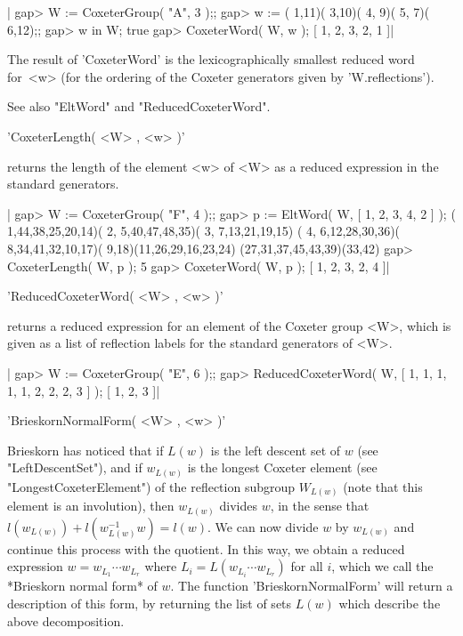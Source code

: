|    gap> W := CoxeterGroup( "A", 3 );;
    gap> w := ( 1,11)( 3,10)( 4, 9)( 5, 7)( 6,12);;
    gap> w in W;
    true
    gap> CoxeterWord( W, w );
    [ 1, 2, 3, 2, 1 ]|

The result  of 'CoxeterWord'  is the lexicographically  smallest reduced
word  for~<w> (for  the  ordering  of the  Coxeter  generators given  by
'W.reflections').

See also "EltWord" and "ReducedCoxeterWord".


'CoxeterLength( <W> , <w> )'

returns the length of the element <w>  of <W> as a reduced expression in
the standard generators.

|    gap> W := CoxeterGroup( "F", 4 );;
    gap> p := EltWord( W, [ 1, 2, 3, 4, 2 ] );
    ( 1,44,38,25,20,14)( 2, 5,40,47,48,35)( 3, 7,13,21,19,15)
    ( 4, 6,12,28,30,36)( 8,34,41,32,10,17)( 9,18)(11,26,29,16,23,24)
    (27,31,37,45,43,39)(33,42)
    gap> CoxeterLength( W, p );
    5
    gap> CoxeterWord( W, p );
    [ 1, 2, 3, 2, 4 ]|


'ReducedCoxeterWord( <W> , <w> )'

returns a  reduced expression for an  element of the Coxeter  group <W>,
which is  given as a {\GAP}  list of reflection labels  for the standard
generators of <W>.

|    gap> W := CoxeterGroup( "E", 6 );;
    gap> ReducedCoxeterWord( W, [ 1, 1, 1, 1, 1, 2, 2, 2, 3 ] );
    [ 1, 2, 3 ]|


'BrieskornNormalForm( <W> , <w> )'

Brieskorn \cite{Bri71}  has noticed that  if $L(w)$ is the  left descent
set  of $w$  (see "LeftDescentSet"),  and if  $w_{L(w)}$ is  the longest
Coxeter element (see "LongestCoxeterElement") of the reflection subgroup
$W_{L(w)}$ (note that this  element is  an involution),  then $w_{L(w)}$
divides  $w$, in  the  sense that  $l(w_{L(w)})+l(w_{L(w)}^{-1}w)=l(w)$.
We  can  now  divide  $w$   by  $w_{L(w)}$  and  continue  this  process
with  the  quotient.  In  this  way,  we  obtain  a  reduced  expression
$w=w_{L_1}  \cdots w_{L_r}$  where $L_i=L(w_{L_i}  \cdots w_{L_r})$  for
all  $i$,  which  we  call  the *Brieskorn  normal  form*  of  $w$.  The
function 'BrieskornNormalForm'  will return a description  of this form,
by  returning  the  list  of   sets  $L(w)$  which  describe  the  above
decomposition.

